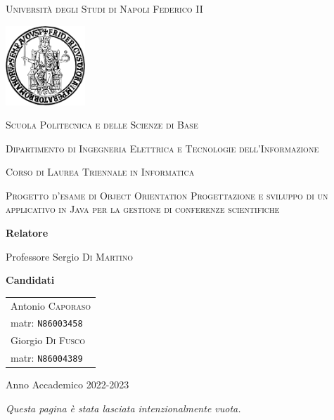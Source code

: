 \documentclass[a4paper, 10.5pt]{book}
\begin{document}
\pagestyle{empty}
\begin{titlepage}
	\begin{center}
		\setlength{\parskip}{2ex}
		
		
		\Large\textsc{Università degli Studi di Napoli Federico II}
		
		\includegraphics[width=3cm]{Immagini/logo-federico-II.pdf}
		
		\Large\textsc{Scuola Politecnica e delle Scienze di Base}
		
		\large\textsc{Dipartimento di Ingegneria Elettrica e Tecnologie dell'Informazione}
		
		\large\textsc{Corso di Laurea Triennale in Informatica}
		
		\textsc{Progetto d'esame di Object Orientation}
		\vfill
		\huge\textsc{Progettazione e sviluppo di un applicativo in Java per la gestione di conferenze scientifiche}
		\vfill
		\begin{minipage}[t]{.49\textwidth}
			\large
			
			\textbf{Relatore}\par
			Professore Sergio \textsc{Di Martino}
		\end{minipage}\hfill
	\begin{minipage}[t]{.45\textwidth}
		\large
		\hspace{3.3cm}\textbf{Candidati}\par
		\hfill\begin{tabular}{l}
			 Antonio \textsc{Caporaso} \\ 
			 matr: \texttt{N86003458} \\
			 Giorgio \textsc{Di Fusco} \\
			  matr: \texttt{N86004389} \\
		 \end{tabular}
	\end{minipage}
\vfill
		
		\large Anno Accademico 2022-2023
	\end{center}
\end{titlepage}

\newpage
\textit{Questa pagina è stata lasciata intenzionalmente vuota.}
\newpage
\tableofcontents
\listoffigures
\end{document}
